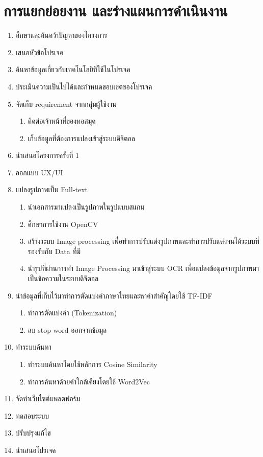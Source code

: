\section{การแยกย่อยงาน และร่างแผนการดำเนินงาน}
\begin{enumerate}
    \item 	ศึกษาและค้นคว้าปัญหาของโครงการ
    \item 	เสนอหัวข้อโปรเจค 
    \item 	ค้นหาข้อมูลเกี่ยวกับเทคโนโลยีที่ใช้ในโปรเจค
    \item 	ประเมินความเป็นไปได้และกำหนดขอบเขตของโปรเจค 
    \item 	จัดเก็บ requirement จากกลุ่มผู้ใช้งาน
    \begin{enumerate}[label*=\arabic*.]
        \item   ติดต่อเจ้าหน้าที่ของหอสมุด
        \item   เก็บข้อมูลที่ต้องการแปลงเข้าสู่ระบบดิจิตอล
    \end{enumerate}
    \item 	นำเสนอโครงการครั้งที่ 1 
    \item 	ออกแบบ UX/UI
    \item 	แปลงรูปภาพเป็น Full-text
    \begin{enumerate}[label*=\arabic*.]
        \item 	นำเอกสารมาแปลงเป็นรูปภาพในรูปแบบสแกน 
        \item  ศึกษาการใช้งาน OpenCV
        \item  สร้างระบบ Image processing เพื่อทำการปรับแต่งรูปภาพและทำการปรับแต่งจนได้ระบบที่รองรับกับ Data ที่มี
        \item  	นำรูปที่ผ่านการทำ Image Processing มาเข้าสู่ระบบ OCR เพื่อแปลงข้อมูลจากรูปภาพมาเป็นข้อความในระบบดิจิตอล 
    \end{enumerate}
    \item 	นำข้อมูลที่เก็บไว้มาทำการตัดแบ่งคำภาษาไทยและหาคำสำคัญโดยใช้ TF-IDF 
    \begin{enumerate}[label*=\arabic*.]
        \item	ทำการตัดแบ่งคำ (Tokenization)
        \item	ลบ stop word ออกจากข้อมูล 
    \end{enumerate}
    \item	ทำระบบค้นหา 
    \begin{enumerate}[label*=\arabic*.]
       \item	ทำระบบค้นหาโดยใช้หลักการ Cosine Similarity
       \item	ทำการค้นหาด้วยคำใกล้เคียงโดยใช้ Word2Vec 
    \end{enumerate}    
    \item   จัดทำเว็บไซต์แพลตฟอร์ม
    \item   ทดสอบระบบ
    \item   ปรับปรุงแก้ไข
    \item   นำเสนอโปรเจค
    \end{enumerate}

